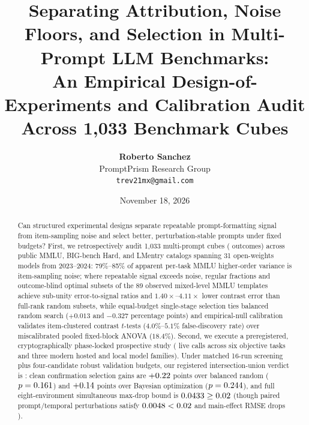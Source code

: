 \documentclass[11pt,a4paper]{article}
\title{\textbf{Separating Attribution, Noise Floors, and Selection in Multi-Prompt LLM Benchmarks:}\\
\large An Empirical Design-of-Experiments and Calibration Audit Across 1,033 Benchmark Cubes}
\author{\textbf{Roberto Sanchez}\\PromptPrism Research Group\\\texttt{trev21mx@gmail.com}}
\date{November 18, 2026}
\begin{document}
\setlength{\emergencystretch}{2.5em}
\maketitle

\begin{abstract}
Can structured experimental designs separate repeatable prompt-formatting signal from item-sampling noise and select better, perturbation-stable prompts under fixed budgets? First, we retrospectively audit 1,033 multi-prompt cubes (\TotalStudyObs{} outcomes) across public MMLU, BIG-bench Hard, and LMentry catalogs spanning 31 open-weights models from 2023--2024: 79\%--85\% of apparent per-task MMLU higher-order variance is item-sampling noise; where repeatable signal exceeds noise, regular fractions and outcome-blind optimal subsets of the 89 observed mixed-level MMLU templates achieve sub-unity error-to-signal ratios and $1.40\times$--$4.11\times$ lower contrast error than full-rank random subsets, while equal-budget single-stage selection ties balanced random search ($+0.013$ and $-0.327$ percentage points) and empirical-null calibration validates item-clustered contrast $t$-tests ($4.0\%$--$5.1\%$ false-discovery rate) over miscalibrated pooled fixed-block ANOVA ($18.4\%$). Second, we execute a preregistered, cryptographically phase-locked prospective study (\RealVFourTotalCalls{} live calls across six objective tasks and three modern hosted and local model families). Under matched 16-run screening plus four-candidate robust validation budgets, our registered intersection-union verdict is \RealVFourVerdictCode{}: clean confirmation selection gains are $+0.22{}$ points over balanced random ($p=0.161{}$) and $+0.14{}$ points over Bayesian optimization ($p=0.244{}$), and full eight-environment simultaneous max-drop bound is $0.0433{} \ge 0.02$ (though paired prompt/temporal perturbations satisfy $0.0048{} < 0.02$ and main-effect RMSE drops \RealVFourEffReductionPct{}).
\end{abstract}
\end{document}
